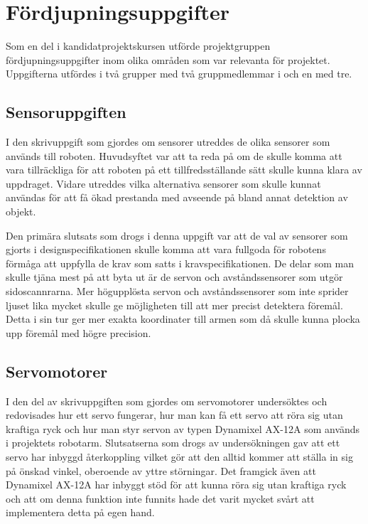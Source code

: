 

\section{Fördjupningsuppgifter}

Som en del i kandidatprojektskursen utförde projektgruppen fördjupningsuppgifter inom olika områden som var relevanta för projektet. Uppgifterna utfördes i två grupper med två gruppmedlemmar i och en med tre.

\subsection{Sensoruppgiften}

I den skrivuppgift som gjordes om sensorer utreddes de olika sensorer som används till roboten. Huvudsyftet var att ta reda på om de skulle komma att vara tillräckliga för att roboten på ett tillfredsställande sätt skulle kunna klara av uppdraget. Vidare utreddes vilka alternativa sensorer som skulle kunnat användas för att få ökad prestanda med avseende på bland annat detektion av objekt. 

Den primära slutsats som drogs i denna uppgift var att de val av sensorer som gjorts i designspecifikationen skulle komma att vara fullgoda för robotens förmåga att uppfylla de krav som satts i kravspecifikationen. De delar som man skulle tjäna mest på att byta ut är de servon och avståndssensorer som utgör sidoscannrarna. Mer högupplösta servon och avståndssensorer som inte sprider ljuset lika mycket skulle ge möjligheten till att mer precist detektera föremål. Detta i sin tur ger mer exakta koordinater till armen som då skulle kunna plocka upp föremål med högre precision.

\subsection{Servomotorer}

I den del av skrivuppgiften som gjordes om servomotorer undersöktes och redovisades hur ett servo fungerar, hur man kan få ett servo att röra sig utan kraftiga ryck och hur man styr servon av typen Dynamixel AX-12A som används i projektets robotarm. Slutsatserna som drogs av undersökningen gav att ett servo har inbyggd återkoppling vilket gör att den alltid kommer att ställa in sig på önskad vinkel, oberoende av yttre störningar. Det framgick även att  Dynamixel AX-12A har inbyggt stöd för att kunna röra sig utan kraftiga ryck och att om denna funktion inte funnits hade det varit mycket svårt att implementera detta på egen hand. 

